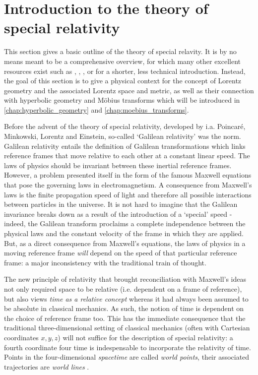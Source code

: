 \section{Introduction to the theory of special relativity}
This section gives a basic outline of the theory of special relavity. It is by no means meant to be a comprehensive overview, for which many other excellent resources exist such as \citet{Misner1970}, \citet{Taylor1992}, \citet{Landau1971}, or \citet{Penrose1978} for a shorter, less technical introduction. Instead, the goal of this section is to give a physical context for the concept of Lorentz geometry and the associated Lorentz space and metric, as well as their connection with hyperbolic geometry and Möbius transforms which will be introduced in \cref{chap:hyperbolic_geometry} and \cref{chap:moebius_transforms}.

Before the advent of the theory of special relativity, developed by i.a. Poincaré, Minkowski, Lorentz and Einstein, so-called `Galilean relativity' was the norm. Galilean relativity entails the definition of Galilean transformations which links reference frames that move relative to each other at a constant linear speed. The laws of physics should be invariant between these inertial reference frames. However, a problem presented itself in the form of the famous Maxwell equations that pose the governing laws in electromagnetism. A consequence from Maxwell's laws is the finite propagation speed of light and therefore all possible interactions between particles in the universe. It is not hard to imagine that the Galilean invariance breaks down as a result of the introduction of a `special' speed - indeed, the Galilean transform proclaims a complete independence between the physical laws and the constant velocity of the frame in which they are applied. But, as a direct consequence from Maxwell's equations, the laws of physics in a moving reference frame \emph{will} depend on the speed of that particular reference frame: a major inconsistency with the traditional train of thought.

The new principle of relativity that brought reconciliation with Maxwell's ideas not only required space to be relative (i.e. dependent on a frame of reference), but also views \emph{time as a relative concept} whereas it had always been assumed to be absolute in classical mechanics. As such, the notion of time is dependent on the choice of reference frame too. This has the immediate consequence that the traditional three-dimensional setting of classical mechanics (often with Cartesian coordinates \(x, y, z\)) will not suffice for the description of special relativity: a fourth coordinate four time is indespensable to incorporate the relativity of time. Points in the four-dimensional \emph{spacetime} are called \emph{world points}, their associated trajectories are \emph{world lines} \cite{Landau1971}.

